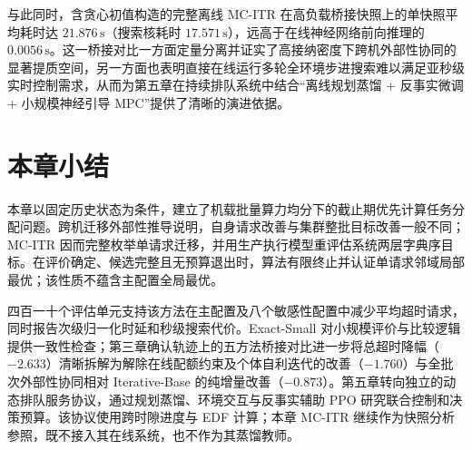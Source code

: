 与此同时，含贪心初值构造的完整离线 MC-ITR 在高负载桥接快照上的单快照平均耗时达 $21.876\,\mathrm{s}$（搜索核耗时 $17.571\,\mathrm{s}$），远高于在线神经网络前向推理的 $0.0056\,\mathrm{s}$。这一桥接对比一方面定量分离并证实了高接纳密度下跨机外部性协同的显著提质空间，另一方面也表明直接在线运行多轮全环境步进搜索难以满足亚秒级实时控制需求，从而为第五章在持续排队系统中结合“离线规划蒸馏 + 反事实微调 + 小规模神经引导 MPC”提供了清晰的演进依据。

\section{本章小结}
\label{sec:ch4-summary}

本章以固定历史状态为条件，建立了机载批量算力均分下的截止期优先计算任务分配问题。跨机迁移外部性推导说明，自身请求改善与集群整批目标改善一般不同；MC-ITR 因而完整枚举单请求迁移，并用生产执行模型重评估系统两层字典序目标。在评价确定、候选完整且无预算退出时，算法有限终止并认证单请求邻域局部最优；该性质不蕴含主配置全局最优。

四百一十个评估单元支持该方法在主配置及八个敏感性配置中减少平均超时请求，同时报告次级归一化时延和秒级搜索代价。Exact-Small 对小规模评价与比较逻辑提供一致性检查；第三章确认轨迹上的五方法桥接对比进一步将总超时降幅（$-2.633$）清晰拆解为解除在线配额约束及个体自利迭代的改善（$-1.760$）与全批次外部性协同相对 Iterative-Base 的纯增量改善（$-0.873$）。第五章转向独立的动态排队服务协议，通过规划蒸馏、环境交互与反事实辅助 PPO 研究联合控制和决策预算。该协议使用跨时隙进度与 EDF 计算；本章 MC-ITR 继续作为快照分析参照，既不接入其在线系统，也不作为其蒸馏教师。
